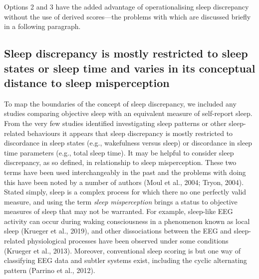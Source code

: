 \documentclass[
]{article}
\begin{document}
Options 2 and 3 have the added advantage of operationalising sleep discrepancy without the use of derived scores---the problems with which are discussed briefly in a following paragraph.

\subsection{Sleep discrepancy is mostly restricted to sleep states or sleep time and varies in its conceptual distance to sleep misperception}\label{misp}

To map the boundaries of the concept of sleep discrepancy, we included any studies comparing objective sleep with an equivalent measure of self-report sleep. From the very few studies identified investigating sleep patterns or other sleep-related behaviours it appears that sleep discrepancy is mostly restricted to discordance in sleep states (e.g., wakefulness versus sleep) or discordance in sleep time parameters (e.g., total sleep time). It may be helpful to consider sleep discrepancy, as so defined, in relationship to sleep misperception. These two terms have been used interchangeably in the past and the problems with doing this have been noted by a number of authors (Moul et al., 2004; Tryon, 2004). Stated simply, sleep is a complex process for which there no one perfectly valid measure, and using the term \emph{sleep misperception} brings a status to objective measures of sleep that may not be warranted. For example, sleep-like EEG activity can occur during waking consciousness in a phenomenon known as local sleep (Krueger et al., 2019), and other dissociations between the EEG and sleep-related physiological processes have been observed under some conditions (Krueger et al., 2013). Moreover, conventional sleep scoring is but one way of classifying EEG data and subtler systems exist, including the cyclic alternating pattern (Parrino et al., 2012).
\end{document}
